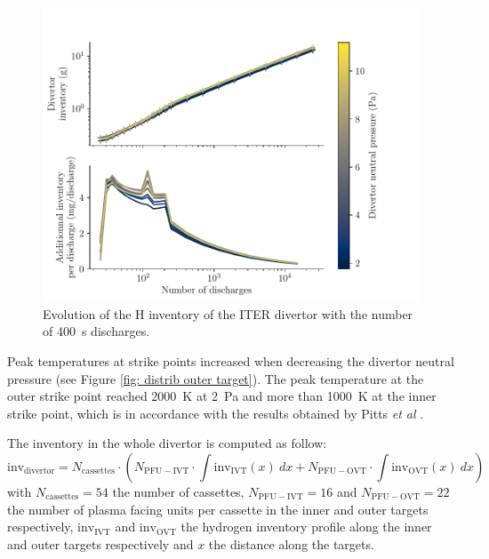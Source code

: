 \begin{figure}[h!]
    \centering
    \includegraphics[width=\linewidth]{Figures/Chapter4/ITER/inventory_vs_time.pdf}
    \caption{Evolution of the H inventory of the ITER divertor with the number of \SI{400}{s} discharges.}
    \label{fig: iter vs time}
\end{figure}


Peak temperatures at strike points increased when decreasing the divertor neutral pressure (see Figure \ref{fig: distrib outer target}).
The peak temperature at the outer strike point reached \SI{2000}{K} at \SI{2}{Pa} and more than \SI{1000}{K} at the inner strike point, which is in accordance with the results obtained by Pitts \textit{et al} .

The inventory in the whole divertor is computed as follow:
\begin{equation}
    \mathrm{inv_{divertor}} = N_\mathrm{cassettes} \cdot \left( N_\mathrm{PFU-IVT} \cdot \int \mathrm{inv_{IVT}}(x)\: dx + N_\mathrm{PFU-OVT} \cdot\int \mathrm{inv_{OVT}}(x) \: dx \right)
\end{equation}
with $N_\mathrm{cassettes}=54$ the number of cassettes, $N_\mathrm{PFU-IVT}=16$ and $N_\mathrm{PFU-OVT}=22$ the number of plasma facing units per cassette in the inner and outer targets respectively, $\mathrm{inv_{IVT}}$ and $\mathrm{inv_{OVT}}$ the hydrogen inventory profile along the inner and outer targets respectively and $x$ the distance along the targets.

